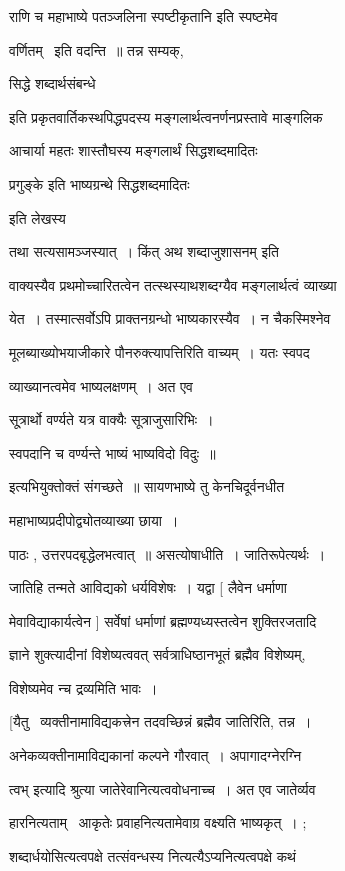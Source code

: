\documentclass[11pt, openany]{book}
\begin{document}
राणि च महाभाष्ये पतञ्जलिना स्पष्टीकृतानि इति स्पष्टमेव 

वर्णितम् \textendash\ इति वदन्ति~॥ तन्न सम्यक्, {\qt सिद्धे शब्दार्थसंबन्धे 

इति प्रकृतवार्तिकस्थपिद्धपदस्य मङ्गलार्थत्वनर्णनप्रस्तावे माङ्गलिक 

आचार्या महतः शास्तौघस्य मङ्गलार्थं सिद्धशब्दमादितः 

प्रगुङ्के इति भाष्यग्रन्थे सिद्धशब्दमादितः} इति लेखस्य 

तथा सत्यसामञ्जस्यात्~। {\qt किंत् अथ शब्दाजुशासनम्} इति 

वाक्यस्यैव प्रथमोच्चारितत्वेन तत्स्थस्याथशब्दग्यैव मङ्गलार्थत्वं
व्याख्या \textendash\ 

येत~। तस्मात्सर्वोऽपि प्राक्तनग्रन्धो भाष्यकारस्यैव~। न चैकस्मिश्नेव 

मूलब्याख्योभयाजीकारे पौनरुक्त्यापत्तिरिति वाच्यम्~। यतः स्वपद \textendash\ 

व्याख्यानत्वमेव भाष्यलक्षणम्~। अत एव \textendash\ 

सू्त्रार्थो वर्ण्यते यत्र वाक्यैः सूत्राजुसारिभिः~। 

स्वपदानि च वर्ण्यन्ते भाष्यं भाष्यविदो विदुः~॥ 

इत्यभियुक्तोक्तं संगच्छते~॥ सायणभाष्ये तु केनचिदूर्वनधीत \textendash\ 



महाभाष्यप्रदीपोद्व्योतव्याख्या छाया~। 

पाठः , उत्तरपदबृद्धेलभत्वात्~॥ असत्योषाधीति~। जातिरूपेत्यर्थः~। 

जातिहि तन्मते आविद्यको धर्यविशेषः~। यद्वा [ लैवेन धर्माणा \textendash\ 

मेवाविद्याकार्यत्वेन ] सर्वेषां धर्माणां ब्रह्मण्यध्यस्तत्वेन
शुक्तिरजतादि \textendash\ 

ज्ञाने शुक्त्यादीनां विशेष्यत्ववत् सर्वत्राधिष्ठानभूतं ब्रह्मैव
विशेष्यम्, 

विशेष्यमेव न्च द्रव्यमिति भावः~। 

[यैतु \textendash\ व्यक्तीनामाविद्यकत्त्रेन तदवच्छिन्नं ब्रह्मैव जातिरिति, तन्न~। 


अनेकव्यक्तीनामाविद्यकानां कल्पने गौरवात्~। अपागादग्नेरग्नि \textendash\ 

त्वभ् इत्यादि श्रुत्या जातेरेवानित्यत्ववोधनाच्च~। अत एव जातेर्व्यव \textendash\ 

हारनित्यताम् \textendash\ आकृतेः प्रवाहनित्यतामेवाग्र वक्ष्यति भाष्यकृत्~। ; 

शब्दार्धयोसित्यत्वपक्षे तत्संवन्धस्य नित्यत्यैऽप्यनित्यत्वपक्षे कथं 
\end{document}
